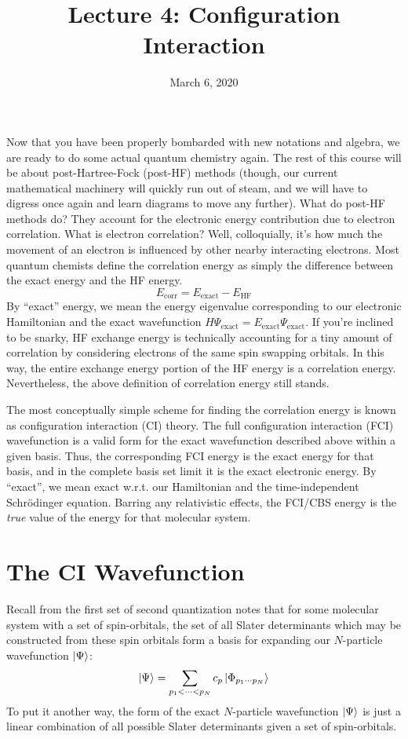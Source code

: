 \documentclass{article}
\title{Lecture 4: Configuration Interaction}
\date{March 6, 2020}
\begin{document}
\maketitle
\noindent
Now that you have been properly bombarded with new notations and algebra, we are ready to do some actual quantum chemistry again. 
The rest of this course will be about post-Hartree-Fock (post-HF) methods (though, our current mathematical machinery will quickly run out of steam, 
    and we will have to digress once again and learn diagrams to move any further).  
What do post-HF methods do? They account for the electronic energy contribution due to electron correlation. 
What is electron correlation? Well, colloquially, it's how much the movement of an electron is influenced by other nearby interacting electrons. 
Most quantum chemists define the correlation energy as simply the difference between the exact energy and the HF energy. 
\[E_{\mathrm{corr}}  = E_{\mathrm{exact}} - E_{\mathrm{HF}} \]
By ``exact'' energy, we mean the energy eigenvalue corresponding to our electronic Hamiltonian and the 
    exact wavefunction $\hat{H} \Psi_{\mathrm{exact}} = E_{\mathrm{exact}}  \Psi_{\mathrm{exact}} $. 
If you're inclined to be snarky, HF exchange energy is technically accounting 
    for a tiny amount of correlation by considering electrons of the same spin swapping orbitals. 
In this way, the entire exchange energy portion of the HF energy is a correlation energy. 
Nevertheless, the above definition of correlation energy still stands.

The most conceptually simple scheme for finding the correlation energy is known as configuration interaction (CI) theory.
The full configuration interaction (FCI) wavefunction is a valid form for the exact wavefunction described above within a given basis.
Thus, the corresponding FCI energy is the exact energy for that basis, and in the complete basis set limit it is the exact electronic energy.
By ``exact'', we mean exact w.r.t. our Hamiltonian and the time-independent Schr{\"o}dinger equation.
Barring any relativistic effects, the FCI/CBS energy is the \textit{true} value of the energy for that molecular system.


\section{The CI Wavefunction} 
Recall from the first set of second quantization notes that for some molecular system with a set of spin-orbitals,
the set of all Slater determinants which may be constructed from these spin orbitals form a basis for expanding our $N$-particle wavefunction $\ket{\Psi}$:
\[ \ket{\Psi} = \sum_{p_1 < \cdots < p_N} c_p \ket{\Phi_{p_1 \cdots p_N}} \]
To put it another way, the form of the exact $N$-particle wavefunction $\ket{\Psi}$ is just a linear combination of all possible Slater determinants given a set of spin-orbitals.
\end{document}
